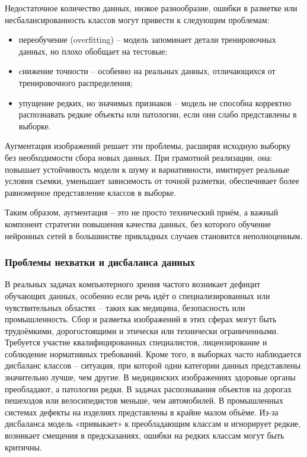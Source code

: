 Недостаточное количество данных, низкое разнообразие, ошибки в разметке или несбалансированность классов могут привести к следующим проблемам:

\begin{itemize}
	\item переобучение (overfitting) – модель запоминает детали тренировочных данных, но плохо обобщает на тестовые;
	\item cнижение точности – особенно на реальных данных, отличающихся от тренировочного распределения;
	\item упущение редких, но значимых признаков – модель не способна корректно распознавать редкие объекты или патологии, если они слабо представлены в выборке.
\end{itemize}

Аугментация изображений решает эти проблемы, расширяя исходную выборку без необходимости сбора новых данных. При грамотной реализации, она: повышает устойчивость модели к шуму и вариативности, имитирует реальные условия съемки, уменьшает зависимость от точной разметки, обеспечивает более равномерное представление классов в выборке.

Таким образом, аугментация – это не просто технический приём, а важный компонент стратегии повышения качества данных, без которого обучение нейронных сетей в большинстве прикладных случаев становится неполноценным.

\subsubsection{Проблемы нехватки и дисбаланса данных}

В реальных задачах компьютерного зрения частого возникает дефицит обучающих данных, особенно если речь идёт о специализированных или чувствительных областях – таких как медицина, безопасность или промышленность. Сбор и разметка изображений в этих сферах могут быть трудоёмкими, дорогостоящими и этически или технически ограниченными. Требуется участие квалифицированных специалистов, лицензирование и соблюдение нормативных требований. Кроме того, в выборках часто наблюдается дисбаланс классов – ситуация, при которой одни категории данных представлены значительно лучше, чем другие. В медицинских изображениях здоровые органы преобладают, а патологии редки. В задачах распознавания объектов на дорогах пешеходов или велосипедистов меньше, чем автомобилей. В промышленных системах дефекты на изделиях представлены в крайне малом объёме. Из-за дисбаланса модель «привыкает» к преобладающим классам и игнорирует редкие, возникает смещения в предсказаниях, ошибки на редких классам могут быть критичны.

